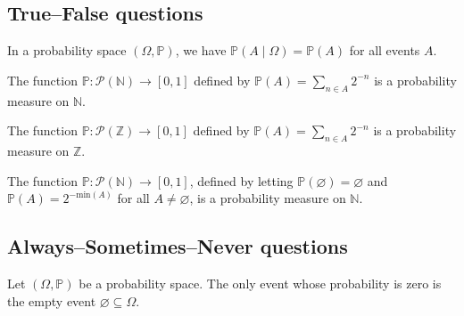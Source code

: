 
\subsection*{True--False questions}


\begin{chapex} %
\label{cqProbabilityTFBegin}
In a probability space $(\Omega, \mathbb{P})$, we have $\mathbb{P}(A \mid \Omega) = \mathbb{P}(A)$ for all events $A$.
\end{chapex}

\begin{chapex} %
The function $\mathbb{P} : \mathcal{P}(\mathbb{N}) \to [0,1]$ defined by $\mathbb{P}(A) = \sum_{n \in A} 2^{-n}$ is a probability measure on $\mathbb{N}$.
\end{chapex}

\begin{chapex} %
The function $\mathbb{P} : \mathcal{P}(\mathbb{Z}) \to [0,1]$ defined by $\mathbb{P}(A) = \sum_{n \in A} 2^{-n}$ is a probability measure on $\mathbb{Z}$.
\end{chapex}

\begin{chapex} %
The function $\mathbb{P} : \mathcal{P}(\mathbb{N}) \to [0,1]$, defined by letting $\mathbb{P}(\varnothing) = \varnothing$ and $\mathbb{P}(A) = 2^{-\mathrm{min}(A)}$ for all $A \ne \varnothing$, is a probability measure on $\mathbb{N}$.
\end{chapex}

\begin{chapex}

\end{chapex}

\begin{chapex}
\label{cqProbabilityTFEnd}
\end{chapex}

\subsection*{Always--Sometimes--Never questions}


\begin{chapex} %
\label{cqProbabilityASNBegin}
Let $(\Omega, \mathbb{P})$ be a probability space. The only event whose probability is zero is the empty event $\varnothing \subseteq \Omega$.
\end{chapex}

\begin{chapex}

\end{chapex}

\begin{chapex}
\label{cqProbabilityASNEnd}

\end{chapex}